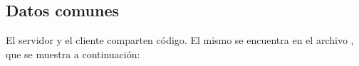 \subsection{Datos comunes}

El servidor y el cliente comparten código. El mismo se encuentra en el archivo
, que se muestra a continuación:

